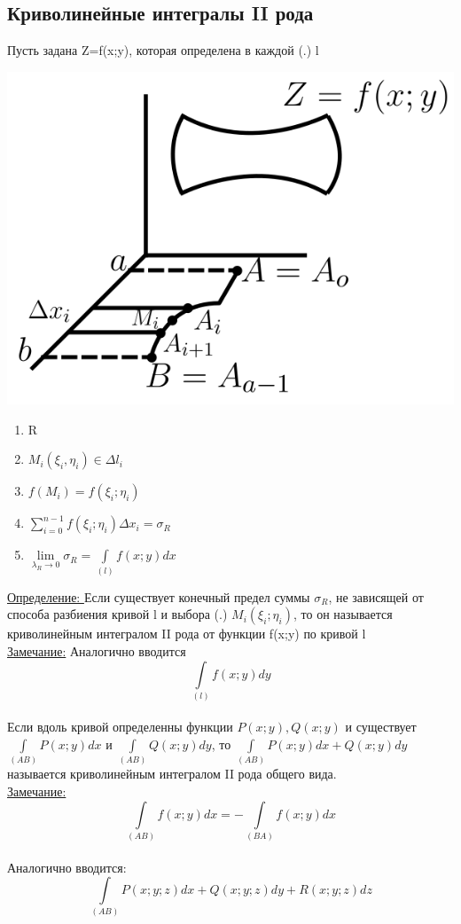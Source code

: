 \documentclass[12pt]{article}
\let\ORIincludegraphics\includegraphics
\renewcommand{\includegraphics}[2][]{\ORIincludegraphics[scale=0.65,#1]{#2}}
\let\oldint\int
\let\oldsum\sum
\let\oldlim\lim
\renewcommand{\int}{\oldint\limits}
\renewcommand{\sum}{\oldsum\limits}
\renewcommand{\lim}{\oldlim\limits}
\begin{document}
  \subsection{Криволинейные интегралы II рода}
  Пусть задана Z=f(x;y), которая определена в каждой (.) l\\
  \begin{minipage}{0.45\textwidth}
    \includegraphics[scale=0.8]{8.3.1.png}
  \end{minipage}
  \hspace{1em}
  \begin{minipage}{0.65\textwidth}
    \begin{enumerate}
      \item R
      \item $M_i(\xi_i,\eta_i) \in \Delta l_i$
      \item $f(M_i)=f(\xi_i;\eta_i)$
      \item $\sum_{i=0}^{n-1}f(\xi_i;\eta_i)\Delta x_i=\sigma_R$
      \item $\lim_{\lambda_R \to 0}\sigma_R=\int_{(l)}f(x;y)dx$
    \end{enumerate}
  \end{minipage}
  \vspace{1em}
  \par
  \underline{Определение: } Если существует конечный предел суммы $\sigma_R$, не зависящей от способа
  разбиения кривой l и выбора (.) $M_i(\xi_i;\eta_i)$, то он называется криволинейным интегралом
  II рода от функции f(x;y) по кривой l\\
  \underline{Замечание:} Аналогично вводится\\
  \[\int_{(l)}f(x;y)dy\]\\
  Если вдоль кривой определенны функции $P(x;y),Q(x;y)$ и существует $\int_{(AB)}P(x;y)dx$ и
  $\int_{(AB)}Q(x;y)dy$, то $\int_{(AB)}P(x;y)dx+Q(x;y)dy$ называется криволинейным интегралом
  II рода общего вида.\\
  \underline{Замечание:} \[\int_{(AB)}f(x;y)dx=-\int_{(BA)}f(x;y)dx\]\\
  Аналогично вводится: \[\int_{(AB)}P(x;y;z)dx+Q(x;y;z)dy+R(x;y;z)dz\]
\end{document}
